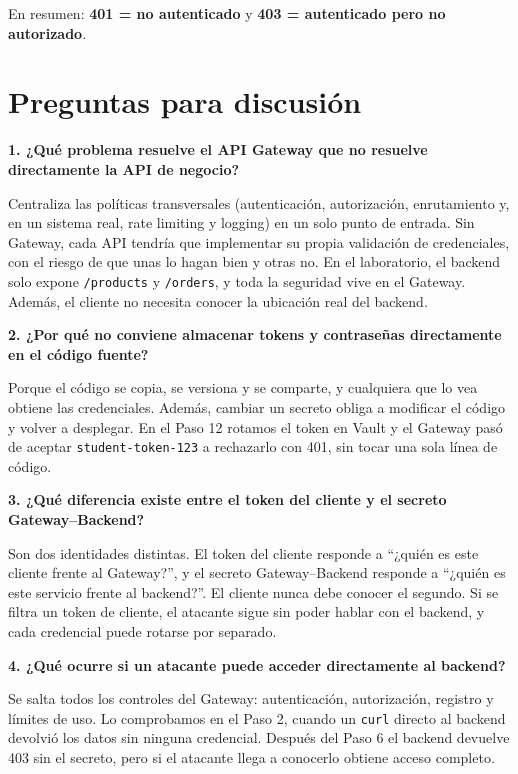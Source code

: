 \documentclass[11pt,a4paper]{article}
\begin{document}
En resumen: \textbf{401 = no autenticado} y \textbf{403 = autenticado pero no autorizado}.

\section{Preguntas para discusión}

\textbf{1. ¿Qué problema resuelve el API Gateway que no resuelve directamente la API de negocio?}

Centraliza las políticas transversales (autenticación, autorización, enrutamiento y, en un sistema real, rate limiting y logging) en un solo punto de entrada. Sin Gateway, cada API tendría que implementar su propia validación de credenciales, con el riesgo de que unas lo hagan bien y otras no. En el laboratorio, el backend solo expone \texttt{/products} y \texttt{/orders}, y toda la seguridad vive en el Gateway. Además, el cliente no necesita conocer la ubicación real del backend.

\textbf{2. ¿Por qué no conviene almacenar tokens y contraseñas directamente en el código fuente?}

Porque el código se copia, se versiona y se comparte, y cualquiera que lo vea obtiene las credenciales. Además, cambiar un secreto obliga a modificar el código y volver a desplegar. En el Paso 12 rotamos el token en Vault y el Gateway pasó de aceptar \texttt{student-token-123} a rechazarlo con 401, sin tocar una sola línea de código.

\textbf{3. ¿Qué diferencia existe entre el token del cliente y el secreto Gateway--Backend?}

Son dos identidades distintas. El token del cliente responde a ``¿quién es este cliente frente al Gateway?'', y el secreto Gateway--Backend responde a ``¿quién es este servicio frente al backend?''. El cliente nunca debe conocer el segundo. Si se filtra un token de cliente, el atacante sigue sin poder hablar con el backend, y cada credencial puede rotarse por separado.

\textbf{4. ¿Qué ocurre si un atacante puede acceder directamente al backend?}

Se salta todos los controles del Gateway: autenticación, autorización, registro y límites de uso. Lo comprobamos en el Paso 2, cuando un \texttt{curl} directo al backend devolvió los datos sin ninguna credencial. Después del Paso 6 el backend devuelve 403 sin el secreto, pero si el atacante llega a conocerlo obtiene acceso completo.
\end{document}
